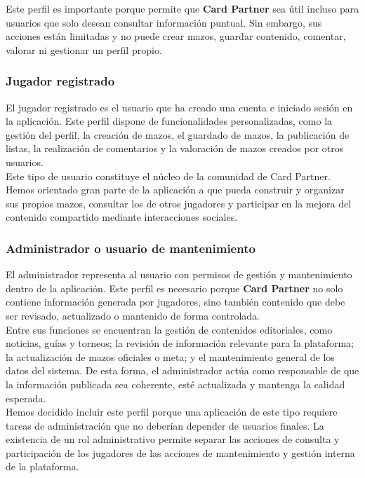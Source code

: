 \documentclass[10pt]{article}
\begin{document}
        Este perfil es importante porque permite que \textbf{Card Partner} sea útil incluso para usuarios que solo desean consultar información puntual. Sin embargo, sus acciones están limitadas y no puede crear mazos, guardar contenido, comentar, valorar ni gestionar un perfil propio.
        
    \subsubsection{Jugador registrado}
        El jugador registrado es el usuario que ha creado una cuenta e iniciado sesión en la aplicación. Este perfil dispone de funcionalidades personalizadas, como la gestión del perfil, la creación de mazos, el guardado de mazos, la publicación de listas, la realización de comentarios y la valoración de mazos creados por otros usuarios.\\
        
        Este tipo de usuario constituye el núcleo de la comunidad de Card Partner. Hemos orientado gran parte de la aplicación a que pueda construir y organizar sus propios mazos, consultar los de otros jugadores y participar en la mejora del contenido compartido mediante interacciones sociales.
        
    \subsubsection{Administrador o usuario de mantenimiento}
        El administrador representa al usuario con permisos de gestión y mantenimiento dentro de la aplicación. Este perfil es necesario porque \textbf{Card Partner} no solo contiene información generada por jugadores, sino también contenido que debe ser revisado, actualizado o mantenido de forma controlada.\\
        
        Entre sus funciones se encuentran la gestión de contenidos editoriales, como noticias, guías y torneos; la revisión de información relevante para la plataforma; la actualización de mazos oficiales o meta; y el mantenimiento general de los datos del sistema. De esta forma, el administrador actúa como responsable de que la información publicada sea coherente, esté actualizada y mantenga la calidad esperada.\\
        
        Hemos decidido incluir este perfil porque una aplicación de este tipo requiere tareas de administración que no deberían depender de usuarios finales. La existencia de un rol administrativo permite separar las acciones de consulta y participación de los jugadores de las acciones de mantenimiento y gestión interna de la plataforma.
        
\end{document}
